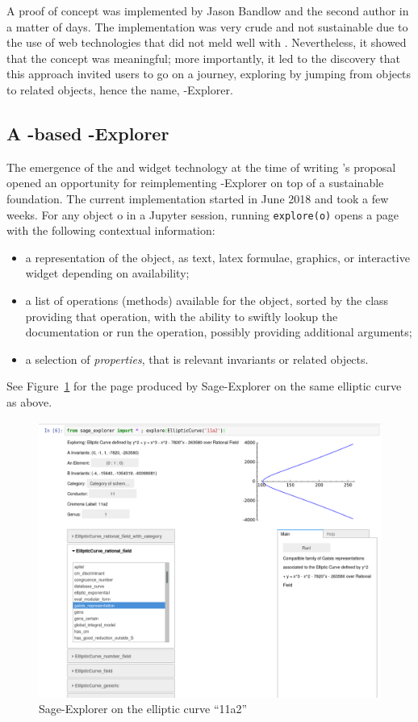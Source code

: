 \documentclass{deliverablereport}
\begin{document}
A proof of concept was implemented by Jason Bandlow and the second
author in a matter of days. The implementation was very crude and not
sustainable due to the use of web technologies that did not meld well
with \Sage. Nevertheless, it showed that the concept was meaningful;
more importantly, it led to the discovery that this approach invited
users to go on a journey, exploring \Sage by jumping from objects to
related objects, hence the name, \Sage-Explorer.


\subsection{A \Jupyter-based \Sage-Explorer}

The emergence of the \Jupyter and \Jupyter widget technology at the
time of writing \ODK's proposal opened an opportunity for
reimplementing \Sage-Explorer on top of a sustainable foundation. The
current implementation started in June 2018 and took a few weeks. For
any \Sage object o in a Jupyter session, running \texttt{explore(o)}
opens a page with the following contextual information:
\begin{itemize}
\item a representation of the object, as text, latex formulae,
  graphics, or interactive widget depending on availability;
\item a list of operations (methods) available for the object, sorted
  by the class providing that operation, with the ability to swiftly
  lookup the documentation or run the operation, possibly providing
  additional arguments;
\item a selection of \emph{properties}, that is relevant invariants or
  related objects.
\end{itemize}
See Figure~\ref{fig:sage-explorer-11a2} for the page produced by
Sage-Explorer on the same elliptic curve as above.
\begin{figure}[h]
  \begin{center}
    \includegraphics[width=\textwidth]{images/SageExplorer-11a2}
  \end{center}
  \caption{Sage-Explorer on the elliptic curve ``11a2''}
  \label{fig:sage-explorer-11a2}
\end{figure}
\end{document}
